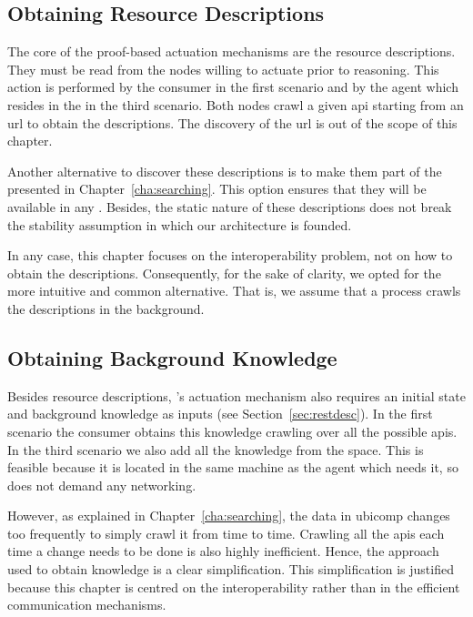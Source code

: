\subsection{Obtaining Resource Descriptions}

The core of the proof-based actuation mechanisms are the resource descriptions.
They must be read from the nodes willing to actuate prior to reasoning. %
This action is performed by the consumer in the first scenario and by the agent which resides in the \Space{} in the third scenario.
Both nodes crawl a given \ac{api} starting from an \ac{url} to obtain the descriptions.
The discovery of the \ac{url} is out of the scope of this chapter.


Another alternative to discover these descriptions is to make them part of the \clues{} presented in Chapter~\ref{cha:searching}.
This option ensures that they will be available in any \consumer{}.
Besides, the static nature of these descriptions does not break the \clues{} stability assumption in which our architecture is founded. %


In any case, this chapter focuses on the interoperability problem, not on how to obtain the descriptions.
Consequently, for the sake of clarity, we opted for the more intuitive and common alternative. %
That is, we assume that a process crawls the descriptions in the background.



\subsection{Obtaining Background Knowledge}

Besides resource descriptions, \citeauthor{verborgh_ijcs_2014}'s actuation mechanism also requires an initial state and background knowledge as inputs (see Section~\ref{sec:restdesc}).
In the first scenario the consumer obtains this knowledge crawling over all the possible \acsp{api}.
In the third scenario we also add all the knowledge from the space.
This is feasible because it is located in the same machine as the agent which needs it, so does not demand any networking. %


However, as explained in Chapter~\ref{cha:searching}, the data in \ac{ubicomp} changes too frequently to simply crawl it from time to time.
Crawling all the \acsp{api} each time a change needs to be done is also highly inefficient.
Hence, the approach used to obtain knowledge is a clear simplification.
This simplification is justified because this chapter is centred on the interoperability rather than in the efficient communication mechanisms.



